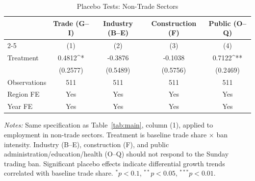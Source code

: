 \begin{table}[htbp]
\centering
\caption{Placebo Tests: Non-Trade Sectors}
\label{tab:placebo}
\begin{tabular}{lcccc}
\hline\hline
 & Trade (G--I) & Industry (B--E) & Construction (F) & Public (O--Q) \\
\cline{2-5}
 & (1) & (2) & (3) & (4) \\
\hline
Treatment & 0.4812^{*} & -0.3876 & -0.1038 & 0.7122^{**} \\
 & (0.2577) & (0.5489) & (0.5756) & (0.2469) \\
\hline
Observations & 511 & 511 & 511 & 511 \\
Region FE & Yes & Yes & Yes & Yes \\
Year FE & Yes & Yes & Yes & Yes \\
\hline\hline
\end{tabular}
\begin{tablenotes}[flushleft]
\small
\item \textit{Notes:} Same specification as Table~\ref{tab:main}, column (1), applied to employment in non-trade sectors. Treatment is baseline trade share $\times$ ban intensity. Industry (B--E), construction (F), and public administration/education/health (O--Q) should not respond to the Sunday trading ban. Significant placebo effects indicate differential growth trends correlated with baseline trade share. $^{*}p<0.1$, $^{**}p<0.05$, $^{***}p<0.01$.
\end{tablenotes}
\end{table}

